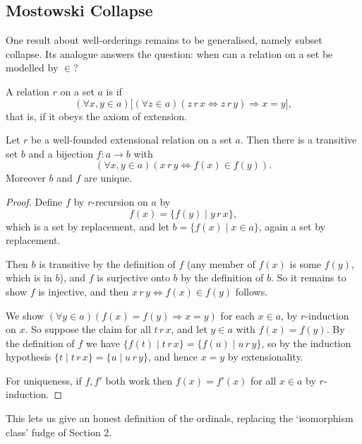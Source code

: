 \documentclass[a4paper]{scrartcl}
\begin{document}
\subsection{Mostowski Collapse}

One result about well-orderings remains to be generalised, namely subset collapse. Its analogue answers the question: when can a relation on a set be modelled by $\in$?

\begin{definition}
  A relation $r$ on a set $a$ is  if
  $$
  (\forall x, y \in a)\bigl[(\forall z \in a)(z \, r \, x \Leftrightarrow z \, r \, y) \Rightarrow x = y\bigr],
  $$
  that is, if it obeys the axiom of extension.
\end{definition}

\begin{theorem}\label{thm:mostowski}
  Let $r$ be a well-founded extensional relation on a set $a$. Then there is a transitive set $b$ and a bijection $f: a \rightarrow b$ with
  $$(\forall x, y \in a)(x \, r \, y \Leftrightarrow f(x) \in f(y)).$$
  Moreover $b$ and $f$ are unique.
\end{theorem}
\begin{proof}
  Define $f$ by $r$-recursion on $a$ by
  $$f(x) = \{f(y) \mid y \, r \, x\},$$
  which is a set by replacement, and let $b = \{f(x) \mid x \in a\}$, again a set by replacement.

  Then $b$ is transitive by the definition of $f$ (any member of $f(x)$ is some $f(y)$, which is in $b$), and $f$ is surjective onto $b$ by the definition of $b$. So it remains to show $f$ is injective, and then $x \, r\, y \Leftrightarrow f(x) \in f(y)$ follows.

  We show $(\forall y \in a)(f(x) = f(y) \Rightarrow x = y)$ for each $x \in a$, by $r$-induction on $x$. So suppose the claim for all $t \, r \, x$, and let $y \in a$ with $f(x) = f(y)$. By the definition of $f$ we have $\{f(t) \mid t \, r\, x\} = \{f(u) \mid u \, r \, y\}$, so by the induction hypothesis $\{t \mid t \, r \, x\} = \{u \mid u\, r\, y\}$, and hence $x = y$ by extensionality.

  For uniqueness, if $f, f'$ both work then $f(x) = f'(x)$ for all $x \in a$ by $r$-induction.
\end{proof}

This lets us give an honest definition of the ordinals, replacing the `isomorphism class' fudge of Section 2.
\end{document}
